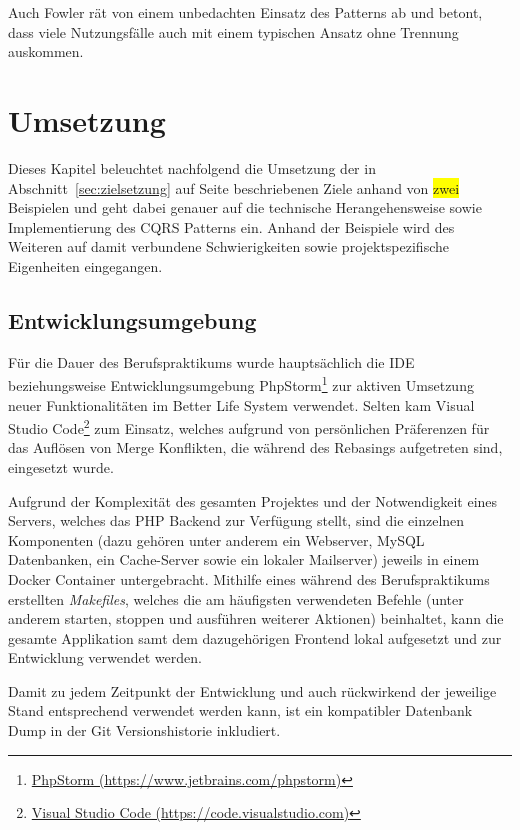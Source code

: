 \documentclass[a4paper,12pt,twoside]{scrreprt}
\begin{document}
Auch Fowler rät von einem unbedachten Einsatz des Patterns ab und betont, dass viele Nutzungsfälle auch mit einem typischen Ansatz ohne Trennung auskommen. \parencite[][]{fowler_cqrs_2011}

\chapter{Umsetzung}
\label{chap:Umsetzung}
Dieses Kapitel beleuchtet nachfolgend die Umsetzung der in Abschnitt~\ref{sec:zielsetzung} auf Seite \pageref{sec:zielsetzung} beschriebenen Ziele anhand von \colorbox{yellow}{zwei} Beispielen und geht dabei genauer auf die technische Herangehensweise sowie Implementierung des CQRS Patterns ein. Anhand der Beispiele wird des Weiteren auf damit verbundene Schwierigkeiten sowie projektspezifische Eigenheiten eingegangen.

\section{Entwicklungsumgebung}
\label{sec:entwicklungsumgebung}
Für die Dauer des Berufspraktikums wurde hauptsächlich die IDE beziehungsweise Entwicklungsumgebung PhpStorm\footnote{\href{https://www.jetbrains.com/phpstorm}{PhpStorm (https://www.jetbrains.com/phpstorm)}} zur aktiven Umsetzung neuer Funktionalitäten im Better Life System verwendet. Selten kam Visual Studio Code\footnote{\href{https://code.visualstudio.com}{Visual Studio Code (https://code.visualstudio.com)}} zum Einsatz, welches aufgrund von persönlichen Präferenzen für das Auflösen von Merge Konflikten, die während des Rebasings aufgetreten sind, eingesetzt wurde.

\smallskip

Aufgrund der Komplexität des gesamten Projektes und der Notwendigkeit eines Servers, welches das PHP Backend zur Verfügung stellt, sind die einzelnen Komponenten (dazu gehören unter anderem ein Webserver, MySQL Datenbanken, ein Cache-Server sowie ein lokaler Mailserver) jeweils in einem Docker Container untergebracht. Mithilfe eines während des Berufspraktikums erstellten \textit{Makefiles}, welches die am häufigsten verwendeten Befehle (unter anderem starten, stoppen und ausführen weiterer Aktionen) beinhaltet, kann die gesamte Applikation samt dem dazugehörigen Frontend lokal aufgesetzt und zur Entwicklung verwendet werden.

Damit zu jedem Zeitpunkt der Entwicklung und auch rückwirkend der jeweilige Stand entsprechend verwendet werden kann, ist ein kompatibler Datenbank Dump in der Git Versionshistorie inkludiert.
\end{document}
